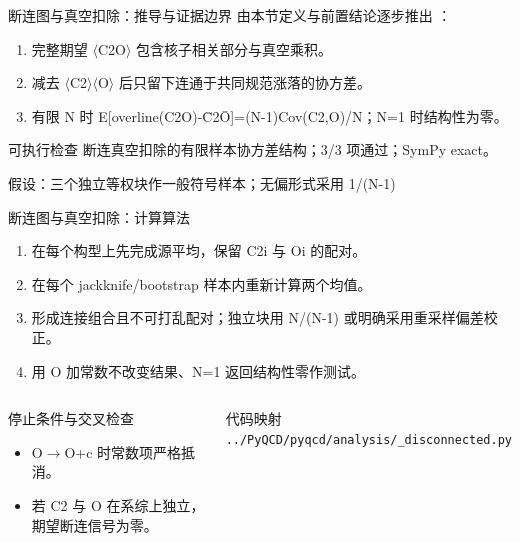 \begin{frame}[t]{断连图与真空扣除：推导与证据边界}
\footnotesize
{}\quad 由本节定义与前置结论逐步推出 ：
\begin{enumerate}
\item 完整期望 \ensuremath{\langle}C2O\ensuremath{\rangle} 包含核子相关部分与真空乘积。
\item 减去 \ensuremath{\langle}C2\ensuremath{\rangle}\ensuremath{\langle}O\ensuremath{\rangle} 后只留下连通于共同规范涨落的协方差。
\item 有限 N 时 E[overline(C2O)-C̄2Ō]=(N-1)Cov(C2,O)/\allowbreak{}N；N=1 时结构性为零。
\end{enumerate}\begin{block}{可执行检查}
\quad 断连真空扣除的有限样本协方差结构；3/3 项通过；SymPy exact。
\par\scriptsize 假设：三个独立等权块作一般符号样本；无偏形式采用 1/\allowbreak{}(N-1)
\end{block}
\end{frame}

\begin{frame}[t]{断连图与真空扣除：计算算法}
\footnotesize
{}\begin{enumerate}
\item 在每个构型上先完成源平均，保留 C2i 与 Oi 的配对。
\item 在每个 jackknife/\allowbreak{}bootstrap 样本内重新计算两个均值。
\item 形成连接组合且不可打乱配对；独立块用 N/\allowbreak{}(N-1) 或明确采用重采样偏差校正。
\item 用 O 加常数不改变结果、N=1 返回结构性零作测试。
\end{enumerate}\begin{columns}[T,onlytextwidth]
\begin{block}{停止条件与交叉检查}\scriptsize\begin{itemize}
\item[\CheckMark] O\ensuremath{\rightarrow}O+c 时常数项严格抵消。
\item[\CheckMark] 若 C2 与 O 在系综上独立，期望断连信号为零。
\end{itemize}\end{block}
\begin{block}{代码映射}
\scriptsize \texttt{.\allowbreak{}.\allowbreak{}/\allowbreak{}PyQCD/\allowbreak{}pyqcd/\allowbreak{}analysis/\allowbreak{}\_\allowbreak{}disconnected.\allowbreak{}py}
\end{block}\end{columns}\end{frame}

